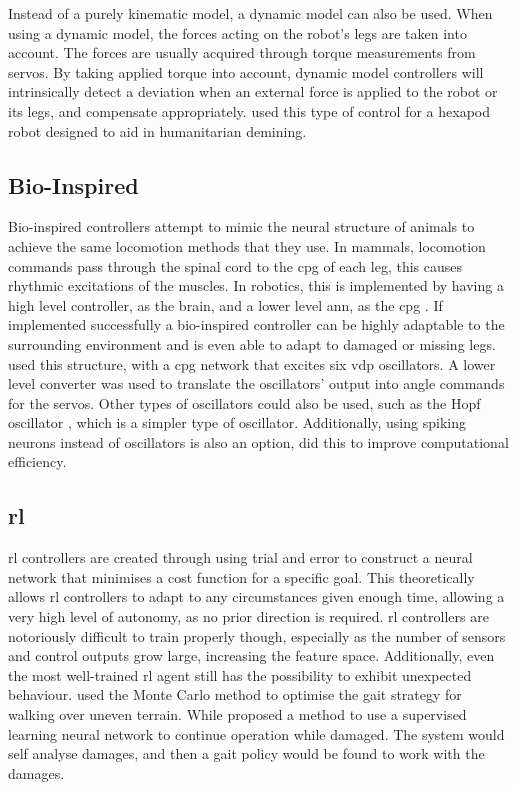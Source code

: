     Instead of a purely kinematic model, a dynamic model can also be used. When using a dynamic model, the forces acting on the robot's legs are taken into account. The forces are usually acquired through torque measurements from servos. By taking applied torque into account, dynamic model controllers will intrinsically detect a deviation when an external force is applied to the robot or its legs, and compensate appropriately. \cite{Khudher2017} used this type of control for a hexapod robot designed to aid in humanitarian demining.
    
    \subsection{Bio-Inspired}
    Bio-inspired controllers attempt to mimic the neural structure of animals to achieve the same locomotion methods that they use. In mammals, locomotion commands pass through the spinal cord to the \ac{cpg} of each leg, this causes rhythmic excitations of the muscles. In robotics, this is implemented by having a high level controller, as the brain, and a lower level \ac{ann}, as the \ac{cpg} \citep{Guo2019}. If implemented successfully a bio-inspired controller can be highly adaptable to the surrounding environment and is even able to adapt to damaged or missing legs. \cite{Yu2013} used this structure, with a \ac{cpg} network that excites six \ac{vdp} oscillators. A lower level converter was used to translate the oscillators' output into angle commands for the servos. Other types of oscillators could also be used, such as the Hopf oscillator \citep{Chen2012}, which is a simpler type of oscillator. Additionally, using spiking neurons instead of oscillators is also an option, \citep{GUTIERREZGALAN202010} did this to improve computational efficiency.

    \newpage
    \subsection{\acf{rl}}
    \acf{rl} controllers are created through using trial and error to construct a neural network that minimises a cost function for a specific goal. This theoretically allows \ac{rl} controllers to adapt to any circumstances given enough time, allowing a very high level of autonomy, as no prior direction is required. \ac{rl} controllers are notoriously difficult to train properly though, especially as the number of sensors and control outputs grow large, increasing the feature space. Additionally, even the most well-trained \ac{rl} agent still has the possibility to exhibit unexpected behaviour. \cite{Liu2019} used the Monte Carlo method to optimise the gait strategy for walking over uneven terrain. While \cite{Verma2019DeepRL} proposed a method to use a supervised learning neural network to continue operation while damaged. The system would self analyse damages, and then a gait policy would be found to work with the damages.
    
